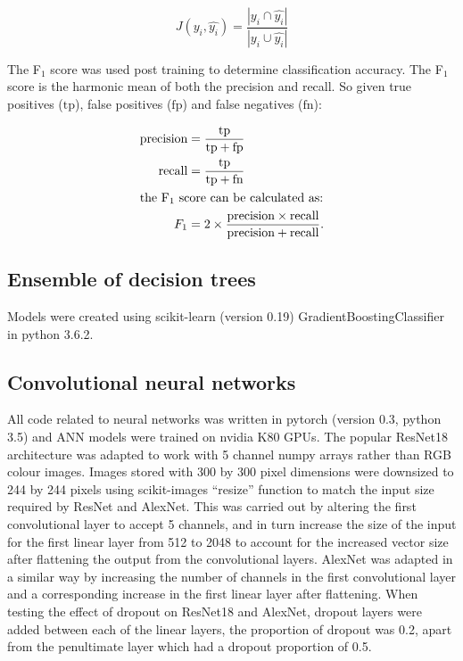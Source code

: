 \documentclass[a4paper,11pt,twoside,openright]{scrbook}
\begin{document}
\begin{equation}
    J(y_i, \hat{y_i}) = \frac{|y_i \cap \hat{y_i}|}{|y_i \cup \hat{y_i}|}
\end{equation}

The F$_1$ score was used post training to determine classification accuracy.
The F$_1$ score is the harmonic mean of both the precision and recall.
So given true positives ($\text{tp}$), false positives ($\text{fp}$) and false negatives ($\text{fn}$):

\begin{align}
        \text{precision} &= \frac{ \text{tp} }{ \text{tp} + \text{fp} } \\
        \text{recall} &= \frac{\text{tp}}{\text{tp} + \text{fn}} \\
        \intertext{the F$_1$ score can be calculated as:}
        F_1 &= 2 \times \frac{\text{precision} \times \text{recall}}{\text{precision} + \text{recall}}.
\end{align}

\subsection{Ensemble of decision trees}
Models were created using scikit-learn (version 0.19) GradientBoostingClassifier in python 3.6.2.

\subsection{Convolutional neural networks}


All code related to neural networks was written in pytorch (version 0.3, python 3.5) and ANN models were trained on nvidia K80 GPUs.
The popular ResNet18 architecture was adapted to work with 5 channel numpy arrays rather than RGB colour images.
Images stored with 300 by 300 pixel dimensions were downsized to 244 by 244 pixels using scikit-images ``resize'' function to match the input size required by ResNet and AlexNet.
This was carried out by altering the first convolutional layer to accept 5 channels, and in turn increase the size of the input for the first linear layer from 512 to 2048 to account for the increased vector size after flattening the output from the convolutional layers.
AlexNet was adapted in a similar way by increasing the number of channels in the first convolutional layer and a corresponding increase in the first linear layer after flattening.
When testing the effect of dropout on ResNet18 and AlexNet, dropout layers were added between each of the linear layers, the proportion of dropout was 0.2, apart from the penultimate layer which had a dropout proportion of 0.5.
\end{document}
